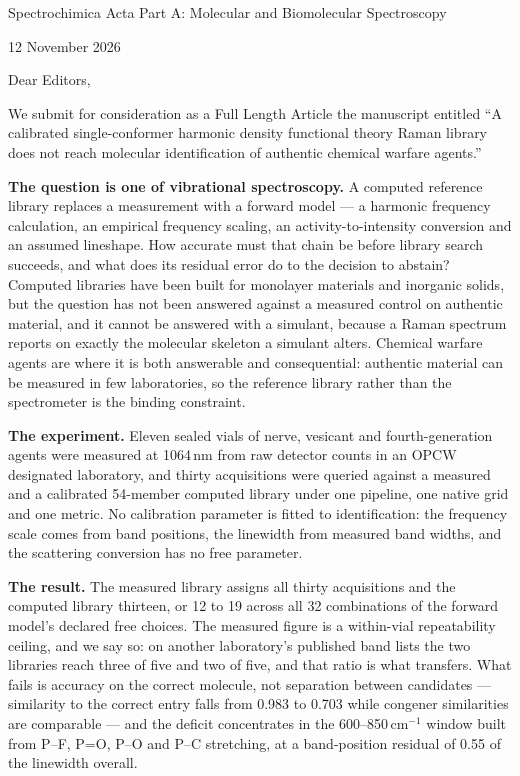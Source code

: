 \documentclass[11pt,a4paper]{article}
\newcommand{\wn}{cm$^{-1}$}
\begin{document}
{\large Spectrochimica Acta Part A: Molecular and Biomolecular Spectroscopy}

12 November 2026

Dear Editors,

We submit for consideration as a Full Length Article the manuscript entitled
``A calibrated single-conformer harmonic density functional theory Raman library does
not reach molecular identification of authentic chemical warfare agents.''

\textbf{The question is one of vibrational spectroscopy.} A computed reference library
replaces a measurement with a forward model --- a harmonic frequency calculation, an
empirical frequency scaling, an activity-to-intensity conversion and an assumed lineshape.
How accurate must that chain be before library search succeeds, and what does its residual
error do to the decision to abstain? Computed libraries have been built for monolayer
materials and inorganic solids, but the question has not been answered against a measured
control on authentic material, and it cannot be answered with a simulant, because a Raman
spectrum reports on exactly the molecular skeleton a simulant alters. Chemical warfare
agents are where it is both answerable and consequential: authentic material can be
measured in few laboratories, so the reference library rather than the spectrometer is the
binding constraint.

\textbf{The experiment.} Eleven sealed vials of nerve, vesicant and fourth-generation agents
were measured at 1064\,nm from raw detector counts in an OPCW designated laboratory, and
thirty acquisitions were queried against a measured and a calibrated 54-member computed
library under one pipeline, one native grid and one metric. No calibration parameter is
fitted to identification: the frequency scale comes from band positions, the linewidth from
measured band widths, and the scattering conversion has no free parameter.

\textbf{The result.} The measured library assigns all thirty acquisitions and the computed
library thirteen, or 12 to 19 across all 32 combinations of the forward model's declared
free choices. The measured figure is a within-vial repeatability ceiling, and we say so: on
another laboratory's published band lists the two libraries reach three of five and two of
five, and that ratio is what transfers. What fails is accuracy on the correct molecule, not
separation between candidates --- similarity to the correct entry falls from 0.983 to 0.703
while congener similarities are comparable --- and the deficit concentrates in the
600--850\,\wn{} window built from P--F, P=O, P--O and P--C stretching, at a band-position residual of 0.55 of the linewidth overall.
\end{document}
